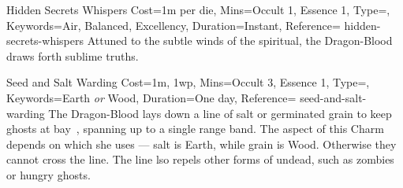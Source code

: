 

\begin{Charm}{Hidden Secrets Whispers}{%
    Cost=1m per die,
    Mins={Occult 1, Essence 1},
    Type=\SupplementalType,
    Keywords={Air, Balanced, Excellency},
    Duration=Instant,
    Reference=\cite*[p.~230]{db}
}{hidden-secrets-whispers}
    Attuned to the subtle winds of the spiritual, the Dragon-Blood draws forth
    sublime truths. 
\end{Charm}


\begin{Charm}{Seed and Salt Warding}{%
    Cost={1m, 1wp},
    Mins={Occult 3, Essence 1},
    Type=\SimpleType,
    Keywords={Earth \emph{or} Wood},
    Duration=One day,
    Reference=\cite*[p.~230]{db}
}{seed-and-salt-warding}
    The Dragon-Blood lays down a line of salt or germinated grain to keep
    ghosts at bay~\parencite*[p.506]{ex3}, spanning up to a single range band.
    The aspect of this Charm depends on which she uses --- salt is Earth, while
    grain is Wood. 
    Otherwise they cannot cross the line. The line lso repels other forms of
    undead, such as zombies or hungry ghosts.
\end{Charm}


